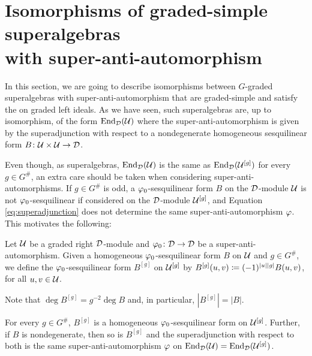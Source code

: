 \section{Isomorphisms of graded-simple superalgebras\texorpdfstring{\\}{} with super-anti-automorphism}\label{sec:iso-vphi-abstract}

In this section, we are going to describe isomorphisms between $G$-graded superalgebras with super-anti-automorphism that are graded-simple and satisfy the \dcc on graded left ideals.
As we have seen, such superalgebras are, up to isomorphism, of the form $\operatorname{End}_{\mathcal{D}} (\mathcal U)$ where the super-anti-automorphism is given by the superadjunction with respect to a nondegenerate homogeneous sesquilinear form $B\colon \mathcal U \times \mathcal U \to \mathcal{D}$.

Even though, as superalgebras, $\operatorname{End}_{\mathcal{D}}( \mathcal U )$ is the same as $\operatorname{End}_{\mathcal{D}}( \mathcal U^{[g]} )$ for every $g \in G^\#$, an extra care should be taken when considering super-anti-automorphisms.
If $g\in G^\#$ is odd, a $\varphi_0$-sesquilinear form $B$ on the $\mathcal{D}$-module $\mathcal U$ is not $\varphi_0$-sesquilinear if considered on the $\mathcal{D}$-module $\mathcal U^{[g]}$, and Equation \eqref{eq:superadjunction} does not determine the same super-anti-automorphism $\varphi$.
This motivates the following:

\begin{defi}\label{defi:shift-on-B}
	Let $\mathcal U$ be a graded right $\mathcal{D}$-module and $\varphi_0\colon \mathcal{D} \to \mathcal{D}$ be a super-anti-automorphism.
	Given a homogeneous $\varphi_0$-sesquilinear form $B$ on $\mathcal U$ and $g\in G^\#$, we define the $\varphi_0$-sesquilinear form  $B^{[g]}$ on $\mathcal U^{[g]}$ by $B^{[g]}(u,v) \coloneqq (-1)^{|u||g|} B(u,v)$, for all $u,v \in \mathcal U$.
\end{defi}

\begin{remark}\label{rmk:deg-B^[g]}
	Note that $\deg B^{[g]} = g^{-2} \deg B$ and, in particular, $|B^{[g]}| = |B|$.
\end{remark}

\begin{lemma}\label{lemma:B^[b]-does-the-job}
	For every $g\in G^\#$, $B^{[g]}$ is a homogeneous $\varphi_0$-sesquilinear form on $\mathcal U^{[g]}$.
	Further, if $B$ is nondegenerate, then so is $B^{[g]}$ and the superadjunction with respect to both is the same super-anti-automorphism $\varphi$ on $\operatorname{End}_{\mathcal{D}}(\mathcal U) = \operatorname{End}_{\mathcal{D}}(\mathcal U^{[g]})$.
\end{lemma}

